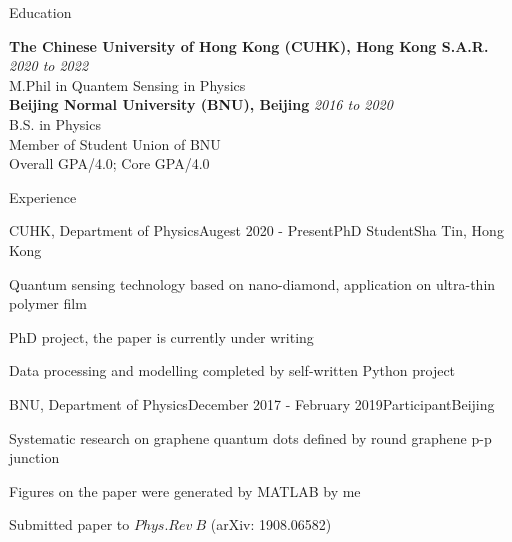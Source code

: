 \documentclass{resume} %
\begin{document}
\begin{sloppypar}


\begin{rSection}{Education}

{\bf The Chinese University of Hong Kong (CUHK), Hong Kong S.A.R.} \hfill {\em 2020 to 2022} \\ 
M.Phil in Quantem Sensing in Physics \\

{\bf Beijing Normal University (BNU), Beijing} \hfill {\em 2016 to 2020} \\ 
B.S. in Physics \\
Member of Student Union of BNU\\
Overall GPA/4.0; Core GPA/4.0 \\

\end{rSection}


\begin{rSection}{Experience}

\begin{rSubsection}{CUHK, Department of Physics}{Augest 2020 - Present}{PhD Student}{Sha Tin, Hong Kong}
\item Quantum sensing technology based on nano-diamond, application on ultra-thin polymer film
\item PhD project, the paper is currently under writing
\item Data processing and modelling completed by self-written Python project

\end{rSubsection}


\begin{rSubsection}{BNU, Department of Physics}{December 2017 - February 2019}{Participant}{Beijing}
\item Systematic research on graphene quantum dots defined by round graphene p-p junction
\item Figures on the paper were generated by MATLAB by me
\item Submitted paper to $Phys.Rev\ B$ (arXiv: 1908.06582)


\end{rSubsection}
\end{rSection}
\end{sloppypar}
\end{document}
